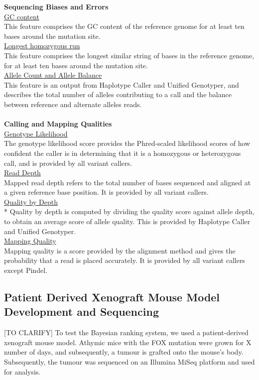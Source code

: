 \documentclass{article}
\begin{document}
\textbf{Sequencing Biases and Errors} \\[0.3\baselineskip]
\underline{GC content}\\
This feature comprises the GC content of the reference genome for at least ten bases around the mutation site.\\[0.3\baselineskip]
\underline{Longest homozygous run}\\
This feature comprises the longest similar string of bases in the reference genome, for at least ten bases around the mutation site.\\[0.3\baselineskip]
\underline{Allele Count and Allele Balance}\\
This feature is an output from Haplotype Caller and Unified Genotyper, and describes the total number of alleles contributing to a call and the balance between reference and alternate alleles reads.\\\\
\textbf{Calling and Mapping Qualities} \\[0.3\baselineskip]
\underline{Genotype Likelihood}\\
The genotype likelihood score provides the Phred-scaled likelihood scores of how confident the caller is in determining that it is a homozygous or heterozygous call, and is provided by all variant callers.\\[0.3\baselineskip]
\underline{Read Depth}\\
Mapped read depth refers to the total number of bases sequenced and aligned at a given reference base position. It is provided by all variant callers.\\[0.3\baselineskip]
\underline{Quality by Depth}\\*
Quality by depth is computed by dividing the quality score against allele depth, to obtain an average score of allele quality. This is provided by Haplotype Caller and Unified Genotyper.\\[0.3\baselineskip]
\underline{Mapping Quality}\\
Mapping quality is a score provided by the alignment method and gives the probability that a read is placed accurately. It is provided by all variant callers except Pindel.\\


\subsection{Patient Derived Xenograft Mouse Model Development and Sequencing}
[TO CLARIFY] To test the Bayesian ranking system, we used a patient-derived xenograft mouse model. Athymic mice with the FOX mutation were grown for X number of days, and subsequently, a tumour is grafted onto the mouse's body. Subsequently, the tumour was sequenced on an Illumina MiSeq platform and used for analysis. 
\end{document}
